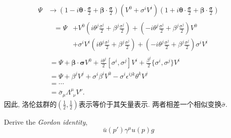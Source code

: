 \begin{equation}
  \begin{aligned}
    \Psi & \rightarrow (1 - i\bm{\theta}\cdot\tfrac{\bm{\sigma}}{2} + \bm{\beta}\cdot\tfrac{\bm{\sigma}}{2}) (V^0 + \sigma^i V^i) (1 + i\bm{\theta}\cdot\tfrac{\bm{\sigma}}{2} + \bm{\beta}\cdot\tfrac{\bm{\sigma}}{2}) \\
         & \begin{aligned}
             \ \ =\Psi & + V^0 (i\theta^j\tfrac{\sigma^j}{2} + \beta^j\tfrac{\sigma^j}{2}) + (-i\theta^j\tfrac{\sigma^j}{2} + \beta^j\tfrac{\sigma^j}{2}) V^0                   \\
                       & + \sigma^i V^i (i\theta^j\tfrac{\sigma^j}{2} + \beta^j\tfrac{\sigma^j}{2}) + (-i\theta^j\tfrac{\sigma^j}{2} + \beta^j\tfrac{\sigma^j}{2}) \sigma^i V^i
           \end{aligned}                                           \\
         & \ = \Psi + \bm{\beta}\cdot\bm{\sigma}V^0 + \tfrac{i\theta^j}{2}[\sigma^i, \sigma^j]V^i +  \tfrac{\beta^j}{2}\{\sigma^i, \sigma^j\}V^i                                                                        \\
         & \ = \Psi + \beta^j V^j + \sigma^i \beta^i V^0 - \sigma^i \epsilon^{ijk} \theta^k V^j                                                                                                                         \\
         & \ = \cdots                                                                                                                                                                                                   \\
         & \ = \bar{\sigma}_{\mu} \Lambda^{\mu}_{\phantom{0}\nu} V^{\nu}.
  \end{aligned}
\end{equation}
因此, 洛伦兹群的$(\frac{1}{2}, \frac{1}{2})$表示等价于其矢量表示.
两者相差一个相似变换$\bar{\sigma}$.

Derive the \textit{Gordon identity},
\begin{equation}
  \bar{u}(p')\gamma^\mu u(p)g
\end{equation}
